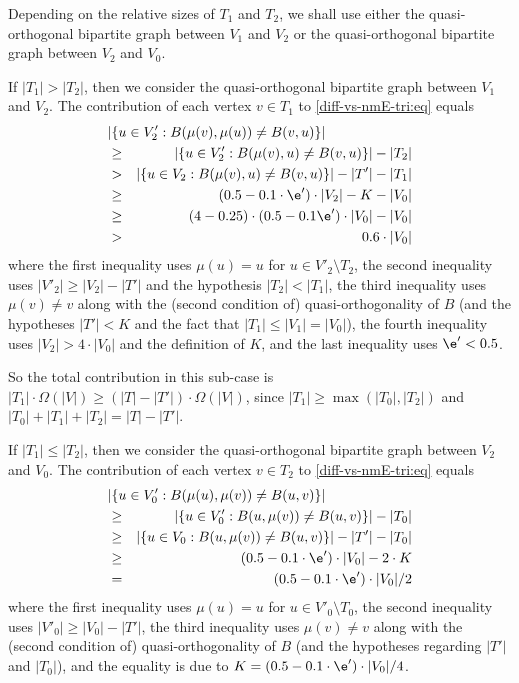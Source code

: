 Depending on the relative sizes of $T_1$ and $T_2$,
we shall use either the quasi-orthogonal bipartite graph
between $V_1$ and $V_2$
or the quasi-orthogonal bipartite graph between $V_2$ and $V_0$.
\BE
\item
If $|T_1|>|T_2|$, then we consider
the quasi-orthogonal bipartite graph between $V_1$ and $V_2$.
%
The contribution of
each vertex $v\in T_1$ to \eqref{diff-vs-nmE-tri:eq} equals
\begin{eqnarray*}
\lefteqn{|\{u\in V'_2:B(\mu(v),\mu(u))\neq B(v,u)\}|} \\
&\geq& |\{u\in V'_2:B(\mu(v),u)\neq B(v,u)\}| - |T_2| \\
&>& |\{u\in V_2:B(\mu(v),u)\neq B(v,u)\}|-|T'|-|T_1| \\
&\geq& (0.5-0.1\cdot\e')\cdot|V_2|-K-|V_0| \\
&\geq& (4-0.25)\cdot(0.5-0.1\e')\cdot|V_0|-|V_0| \\
%
%
%
%
%
%
%
&>& 0.6\cdot|V_0|
%
%
%
%
%
%
%
\end{eqnarray*}
where the first inequality uses $\mu(u)=u$ for $u\in V'_2\setminus T_2$,
the second inequality uses $|V'_2|\geq|V_2|-|T'|$
and the hypothesis $|T_2|<|T_1|$,
the third inequality uses $\mu(v)\neq v$
along with the (second condition of) quasi-orthogonality of $B$
%
(and the hypotheses $|T'|<K$
and the fact that $|T_1|\leq|V_1|=|V_0|$),
the fourth inequality uses $|V_2|>4\cdot|V_0|$ and the definition of $K$,
and the last inequality uses $\e'<0.5$.
%

So the total contribution in this sub-case is
$|T_1|\cdot\Omega(|V|)\geq(|T|-|T'|)\cdot\Omega(|V|)$,
since $|T_1|\geq\max(|T_0|,|T_2|)$ and $|T_0|+|T_1|+|T_2|=|T|-|T'|$.
\item
If $|T_1|\leq|T_2|$, then
we consider the quasi-orthogonal bipartite graph between $V_2$ and $V_0$.
%
The contribution of
each vertex $v\in T_2$ to \eqref{diff-vs-nmE-tri:eq} equals
\begin{eqnarray*}
\lefteqn{|\{u\in V'_0:B(\mu(u),\mu(v))\neq B(u,v)\}|} \\
&\geq& |\{u\in V'_0:B(u,\mu(v))\neq B(u,v)\}| - |T_0| \\
&\geq& |\{u\in V_0:B(u,\mu(v))\neq B(u,v)\}|-|T'|-|T_0| \\
&\geq& (0.5-0.1\cdot\e')\cdot|V_0|-2\cdot K \\
&=& (0.5-0.1\cdot\e')\cdot|V_0|/2
%
%
%
\end{eqnarray*}
where the first inequality uses $\mu(u)=u$ for $u\in V'_0\setminus T_0$,
the second inequality uses $|V'_0|\geq|V_0|-|T'|$,
the third inequality uses $\mu(v)\neq v$
along with the (second condition of) quasi-orthogonality of $B$
(and the hypotheses regarding $|T'|$ and $|T_0|$),
and the equality is due to $K=(0.5-0.1\cdot\e')\cdot|V_0|/4$.
%

